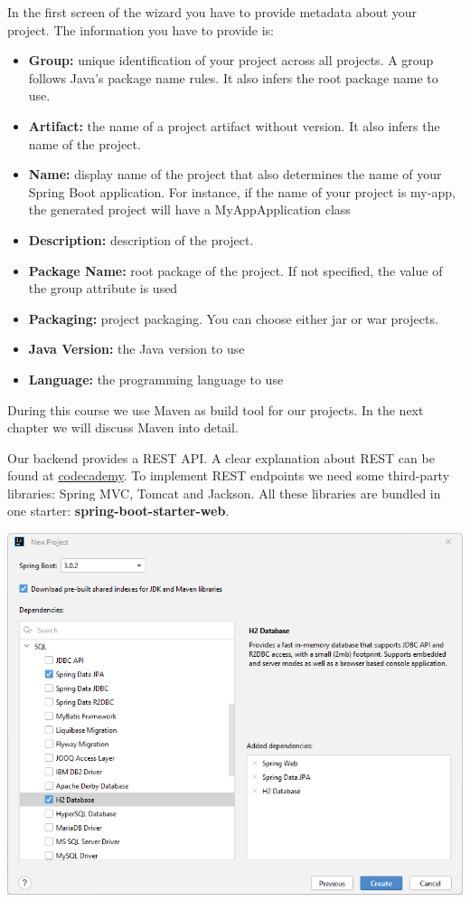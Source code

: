 In the first screen of the wizard you have to provide metadata about your project.  The information you have to provide is:
\begin{itemize}
\item \textbf{Group:} unique identification of your project across all projects.  A group follows Java's package name rules. It also infers the root package name to use.
\item \textbf{Artifact:} the name of a project artifact without version.  It also infers the name of the project.
\item \textbf{Name:} display name of the project that also determines the name of your Spring Boot application. For instance,  if the name of your project is my-app, the generated project will have a MyAppApplication class
\item \textbf{Description:} description of the project.
\item \textbf{Package Name:} root package of the project. If not specified, the value of the group attribute is used
\item \textbf{Packaging:} project packaging.  You can choose either jar or war projects.
\item \textbf{Java Version:} the Java version to use
\item \textbf{Language:} the programming language to use
\end{itemize}

During this course we use Maven as build tool for our projects. In the next chapter we will discuss Maven into detail.

Our backend provides a REST API. A clear explanation about REST can be found at \href{https://www.codecademy.com/article/what-is-rest.}{codecademy}.  To implement REST endpoints we need some third-party libraries: Spring MVC, Tomcat and Jackson. All these libraries are bundled in one starter: \textbf{spring-boot-starter-web}.

\includegraphics[width=\textwidth]{./images/chapter2/new_project_metadata.png}

